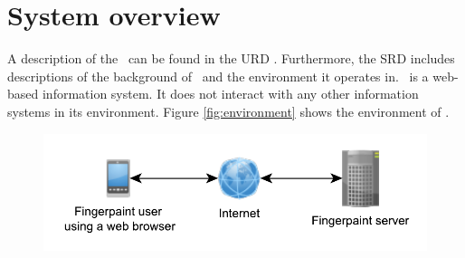 \chapter{System overview}
\label{chap:systoverview}
A description of the \applicationname\ can be found in the URD \cite{urd}. Furthermore, the SRD \cite{srd} includes descriptions of the background of \projectname\ and the environment it operates in.
\projectname\ is a web-based information system. It does not interact with any other information systems in its environment. Figure \ref{fig:environment} shows the environment of \projectname.

\begin{figure}[h!]
\begin{center}
\includegraphics[keepaspectratio=true,width=\textwidth]{Environment.pdf}
\end{center}
\end{figure}

